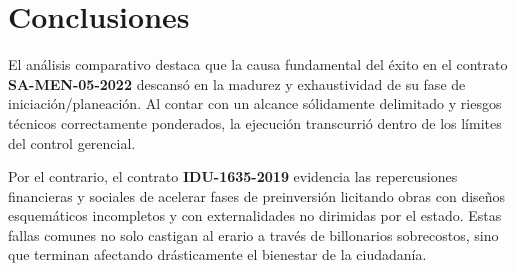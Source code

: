 \documentclass[9pt,a4paper,oneside]{rho-class/rho}
\begin{document}
\section{Conclusiones}

    El análisis comparativo destaca que la causa fundamental del éxito en el contrato \textbf{SA-MEN-05-2022} descansó en la madurez y exhaustividad de su fase de iniciación/planeación. Al contar con un alcance sólidamente delimitado y riesgos técnicos correctamente ponderados, la ejecución transcurrió dentro de los límites del control gerencial.
    
    Por el contrario, el contrato \textbf{IDU-1635-2019} evidencia las repercusiones financieras y sociales de acelerar fases de preinversión licitando obras con diseños esquemáticos incompletos y con externalidades no dirimidas por el estado. Estas fallas comunes no solo castigan al erario a través de billonarios sobrecostos, sino que terminan afectando drásticamente el bienestar de la ciudadanía.
\end{document}
